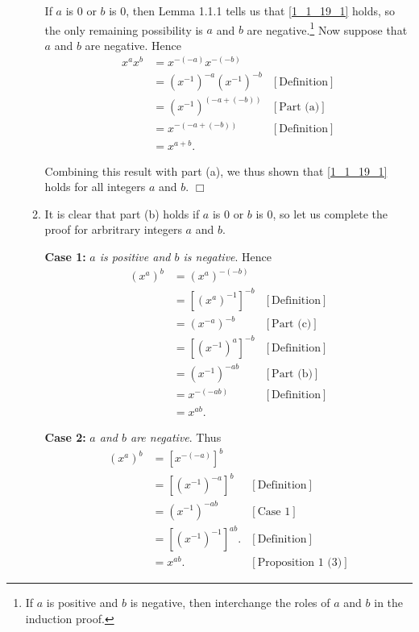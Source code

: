\documentclass[9pt]{article}
\newcommand{\qed}{\hfill \ensuremath{\Box}}
\begin{document}
\begin{enumerate}
\begin{enumerate}
               If $a$ is 0 or $b$ is 0, then Lemma 1.1.1 tells us that
               \eqref{1_1_19_1} holds, so the only remaining possibility is $a$ 
               and $b$ are negative.\footnote{If $a$ is positive and $b$ is
               negative, then interchange the roles of $a$ and $b$ in the 
               induction proof.} Now suppose that $a$ and $b$ are negative.
               Hence
               \begin{align*}
                  x^ax^b &= x^{-(-a)}x^{-(-b)} \\
                     &= (x^{-1})^{-a}(x^{-1})^{-b} &[\text{Definition}] \\
                     &= (x^{-1})^{(-a + (-b))} &[\text{Part (a)}] \\
                     &= x^{-(-a + (-b))} &[\text{Definition}] \\
                     &= x^{a+b}.
               \end{align*}

               Combining this result with part (a), we thus shown that
               \eqref{1_1_19_1} holds for all integers $a$ and $b$. \qed
         \item It is clear that part (b) holds if $a$ is 0 or $b$ is 0, so let
               us complete the proof for arbritrary integers $a$ and $b$.

               \textbf{Case 1:} \textit{$a$ is positive and $b$ is negative}. 
               Hence
               \begin{align*}
                  (x^a)^b &= (x^a)^{-(-b)} \\
                          &= [(x^a)^{-1}]^{-b} &[\text{Definition}] \\
                          &= (x^{-a})^{-b} &[\text{Part (c)}] \\
                          &= [(x^{-1})^a]^{-b} &[\text{Definition}] \\
                          &= (x^{-1})^{-ab} &[\text{Part (b)}] \\
                          &= x^{-(-ab)} &[\text{Definition}] \\
                          &= x^{ab}.
               \end{align*}

               \textbf{Case 2:} \textit{$a$ and $b$ are negative}. Thus
               \begin{align*}
                  (x^a)^b &= [x^{-(-a)}]^b \\
                          &= [(x^{-1})^{-a}]^b &[\text{Definition}] \\
                          &= (x^{-1})^{-ab} &[\text{Case 1}] \\
                          &= [(x^{-1})^{-1}]^{ab}. &[\text{Definition}] \\
                          &= x^{ab}. &[\text{Proposition 1 (3)}]
               \end{align*}


\end{enumerate}
\end{enumerate}
\end{document}
